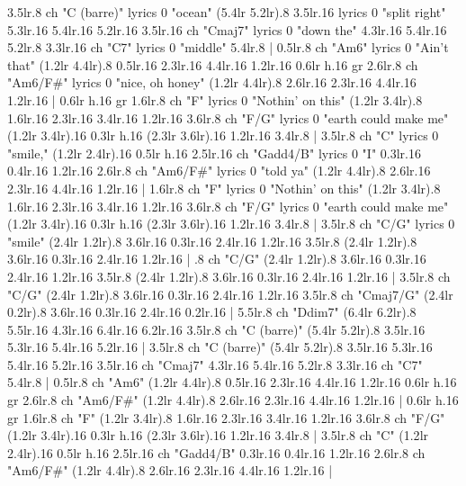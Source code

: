 3.5{lr}.8 {ch "C (barre)" lyrics 0 "ocean"} (5.4{lr} 5.2{lr}).8 3.5{lr}.16 {lyrics 0 "split right"} 5.3{lr}.16 5.4{lr}.16 5.2{lr}.16 3.5{lr}.16 {ch "Cmaj7" lyrics 0 "down the"} 4.3{lr}.16 5.4{lr}.16 5.2{lr}.8 3.3{lr}.16 {ch "C7" lyrics 0 "middle"} 5.4{lr}.8 |
0.5{lr}.8 {ch "Am6" lyrics 0 "Ain't that"} (1.2{lr} 4.4{lr}).8 0.5{lr}.16 2.3{lr}.16 4.4{lr}.16 1.2{lr}.16 0.6{lr h}.16 {gr} 2.6{lr}.8 {ch "Am6/F#" lyrics 0 "nice, oh honey"} (1.2{lr} 4.4{lr}).8 2.6{lr}.16 2.3{lr}.16 4.4{lr}.16 1.2{lr}.16 |
0.6{lr h}.16 {gr} 1.6{lr}.8 {ch "F" lyrics 0 "Nothin' on this"} (1.2{lr} 3.4{lr}).8 1.6{lr}.16 2.3{lr}.16 3.4{lr}.16 1.2{lr}.16 3.6{lr}.8 {ch "F/G" lyrics 0 "earth could make me"} (1.2{lr} 3.4{lr}).16 0.3{lr h}.16 (2.3{lr} 3.6{lr}).16 1.2{lr}.16 3.4{lr}.8 |
3.5{lr}.8 {ch "C" lyrics 0 "smile,"} (1.2{lr} 2.4{lr}).16 0.5{lr h}.16 2.5{lr}.16 {ch "Gadd4/B" lyrics 0 "I"} 0.3{lr}.16 0.4{lr}.16 1.2{lr}.16 2.6{lr}.8 {ch "Am6/F#" lyrics 0 "told ya"} (1.2{lr} 4.4{lr}).8 2.6{lr}.16 2.3{lr}.16 4.4{lr}.16 1.2{lr}.16 |
1.6{lr}.8 {ch "F" lyrics 0 "Nothin' on this"} (1.2{lr} 3.4{lr}).8 1.6{lr}.16 2.3{lr}.16 3.4{lr}.16 1.2{lr}.16 3.6{lr}.8 {ch "F/G" lyrics 0 "earth could make me"} (1.2{lr} 3.4{lr}).16 0.3{lr h}.16 (2.3{lr} 3.6{lr}).16 1.2{lr}.16 3.4{lr}.8 |
3.5{lr}.8 {ch "C/G" lyrics 0 "smile"} (2.4{lr} 1.2{lr}).8 3.6{lr}.16 0.3{lr}.16 2.4{lr}.16 1.2{lr}.16 3.5{lr}.8 (2.4{lr} 1.2{lr}).8 3.6{lr}.16 0.3{lr}.16 2.4{lr}.16 1.2{lr}.16 |
.8 {ch "C/G"} (2.4{lr} 1.2{lr}).8 3.6{lr}.16 0.3{lr}.16 2.4{lr}.16 1.2{lr}.16 3.5{lr}.8 (2.4{lr} 1.2{lr}).8 3.6{lr}.16 0.3{lr}.16 2.4{lr}.16 1.2{lr}.16 |
3.5{lr}.8 {ch "C/G"} (2.4{lr} 1.2{lr}).8 3.6{lr}.16 0.3{lr}.16 2.4{lr}.16 1.2{lr}.16 3.5{lr}.8 {ch "Cmaj7/G"} (2.4{lr} 0.2{lr}).8 3.6{lr}.16 0.3{lr}.16 2.4{lr}.16 0.2{lr}.16 |
5.5{lr}.8 {ch "Ddim7"} (6.4{lr} 6.2{lr}).8 5.5{lr}.16 4.3{lr}.16 6.4{lr}.16 6.2{lr}.16 3.5{lr}.8 {ch "C (barre)"} (5.4{lr} 5.2{lr}).8 3.5{lr}.16 5.3{lr}.16 5.4{lr}.16 5.2{lr}.16 |
3.5{lr}.8 {ch "C (barre)"} (5.4{lr} 5.2{lr}).8 3.5{lr}.16 5.3{lr}.16 5.4{lr}.16 5.2{lr}.16 3.5{lr}.16 {ch "Cmaj7"} 4.3{lr}.16 5.4{lr}.16 5.2{lr}.8 3.3{lr}.16 {ch "C7"} 5.4{lr}.8 |
0.5{lr}.8 {ch "Am6"} (1.2{lr} 4.4{lr}).8 0.5{lr}.16 2.3{lr}.16 4.4{lr}.16 1.2{lr}.16 0.6{lr h}.16 {gr} 2.6{lr}.8 {ch "Am6/F#"} (1.2{lr} 4.4{lr}).8 2.6{lr}.16 2.3{lr}.16 4.4{lr}.16 1.2{lr}.16 |
0.6{lr h}.16 {gr} 1.6{lr}.8 {ch "F"} (1.2{lr} 3.4{lr}).8 1.6{lr}.16 2.3{lr}.16 3.4{lr}.16 1.2{lr}.16 3.6{lr}.8 {ch "F/G"} (1.2{lr} 3.4{lr}).16 0.3{lr h}.16 (2.3{lr} 3.6{lr}).16 1.2{lr}.16 3.4{lr}.8 |
3.5{lr}.8 {ch "C"} (1.2{lr} 2.4{lr}).16 0.5{lr h}.16 2.5{lr}.16 {ch "Gadd4/B"} 0.3{lr}.16 0.4{lr}.16 1.2{lr}.16 2.6{lr}.8 {ch "Am6/F#"} (1.2{lr} 4.4{lr}).8 2.6{lr}.16 2.3{lr}.16 4.4{lr}.16 1.2{lr}.16 |
